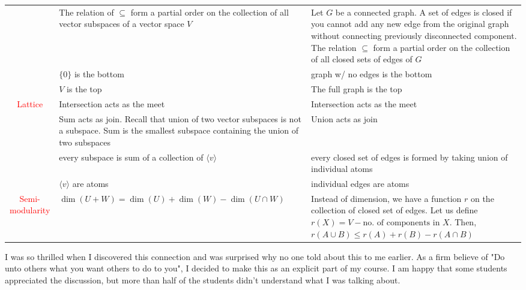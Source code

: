 \documentclass[12pt]{amsart}
\begin{document}
\begin{table}[htbp]
    \centering
    \renewcommand{\arraystretch}{1.8}
    \begin{tabular}{| c | >{\raggedright\arraybackslash}p{5.25cm} | >{\raggedright\arraybackslash}p{6.25cm} |}
        \hline
        & \multicolumn{1}{c|}{\textbf{Vector spaces}} & \multicolumn{1}{c|}{\textbf{Graphs}} \\
        \hline
        & The relation of $\subseteq$ form a partial order on the collection of all vector subspaces of a vector space $V$ &  Let $G$ be a connected graph. A set of edges is closed if you cannot add any new edge from the original graph without connecting previously disconnected component.  The relation $\subseteq$ form a partial order on the collection of all closed sets of edges of $G$\\
        & $\{0\}$ is the bottom & graph w/ no edges is the bottom \\
        & $V$ is the top & The full graph is the top \\
        \hline
        \multirow{4}{*}{{\textcolor{red}{Lattice}}} 
        & Intersection acts as the meet & Intersection acts as the meet \\
        \cline{2-3}
        & Sum acts as join.  Recall that union of two vector subspaces is not a subspace.  Sum is the smallest subspace containing the union of two subspaces & Union acts as join \\
        \cline{2-3}
        
        \hline
        \multirow{2}{*}{{\textcolor{red}{Atomistic}}} 
        & every subspace is sum of a collection of $\langle v \rangle$ & every closed set of edges is formed by taking union of individual atoms \\
        & $\langle v \rangle$ are atoms & individual edges are atoms \\
        \hline
        {\textcolor{red}{Semi-modularity}}
        & $\dim(U+W) = \dim(U) + \dim(W) - \dim(U \cap W)$ 
        & Instead of dimension, we have a function $r$ on the collection of closed set of edges.  Let us define $r(X) = V - \text{no. of components in } X$.  Then, \newline 
        $r(A \cup B) \leq r(A) + r(B) - r(A \cap B)$ \\
        \hline
    \end{tabular}
\end{table} 

I was so thrilled when I discovered this connection and was surprised why no one told about this to me earlier.  As a firm believe of "Do unto others what you want others to do to you", I decided to make this as an explicit part of my course.  I am happy that some students appreciated the discussion, but more than half of the students didn't understand what I was talking about.
\end{document}
